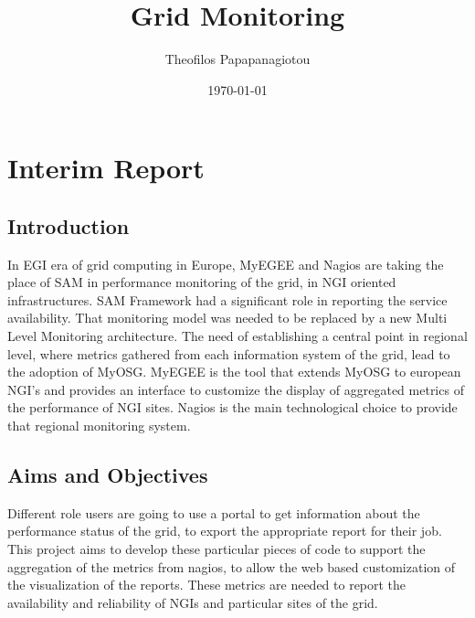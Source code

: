 \documentclass[a4paper,12pt,oneside]{book}
\begin{document}
\title{Grid Monitoring}
\author{Theofilos Papapanagiotou}
\date{\today}
\maketitle
\frontmatter

\tableofcontents
\clearpage
\mainmatter
\pagestyle{fancy}
\renewcommand{\headrulewidth}{1pt}
\renewcommand{\footrulewidth}{1pt}
\addtolength{\headheight}{0pt}
\fancyfoot[LE]{\thepage}
\addtolength{\textheight}{70pt}

\chapter[Interim Report]{Interim Report}
\section{Introduction}

In EGI era of grid computing in Europe, MyEGEE and Nagios are taking the place
of SAM in performance monitoring of the grid, in NGI oriented infrastructures.
SAM Framework had a significant role in reporting the service availability.
That monitoring model was needed to be replaced by a new Multi Level Monitoring
architecture. The need of establishing a central point in regional level, where
metrics gathered from each information system of the grid, lead to the adoption
of MyOSG. MyEGEE is the tool that extends MyOSG to european NGI's and provides
an interface to customize the display of aggregated metrics of the performance
of NGI sites. Nagios is the main technological choice to provide that regional
monitoring system.

\section{Aims and Objectives}

Different role users are going to use a portal to get information about the
performance status of the grid, to export the appropriate report for their job.
This project aims to develop these particular pieces of code to support the 
aggregation of the metrics from nagios, to allow the web based customization of
the visualization of the reports. These metrics are needed to report the
availability and reliability of NGIs and particular sites of the grid.
\end{document}
